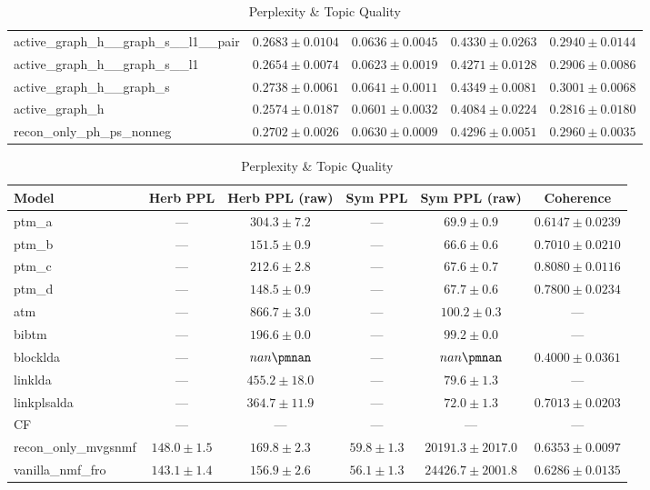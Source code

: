 \begin{table}[htbp]
\begin{subtable}{\textwidth}
\begin{tabular}{lcccc}
active\_graph\_h\_\_graph\_s\_\_l1\_\_pair & $0.2683\pm0.0104$ & $0.0636\pm0.0045$ & $0.4330\pm0.0263$ & $0.2940\pm0.0144$ \\
active\_graph\_h\_\_graph\_s\_\_l1 & $0.2654\pm0.0074$ & $0.0623\pm0.0019$ & $0.4271\pm0.0128$ & $0.2906\pm0.0086$ \\
active\_graph\_h\_\_graph\_s & $0.2738\pm0.0061$ & $0.0641\pm0.0011$ & $0.4349\pm0.0081$ & $0.3001\pm0.0068$ \\
active\_graph\_h & $0.2574\pm0.0187$ & $0.0601\pm0.0032$ & $0.4084\pm0.0224$ & $0.2816\pm0.0180$ \\
recon\_only\_ph\_ps\_nonneg & $0.2702\pm0.0026$ & $0.0630\pm0.0009$ & $0.4296\pm0.0051$ & $0.2960\pm0.0035$ \\
\bottomrule
\end{tabular}
\end{subtable}
\vspace{0.3cm}
\begin{subtable}{\textwidth}
\centering
\caption{Perplexity \& Topic Quality}
\begin{tabular}{lccccc}
\toprule
Model & Herb PPL & Herb PPL (raw) & Sym PPL & Sym PPL (raw) & Coherence \\
\midrule
ptm\_a & --- & $304.3\pm7.2$ & --- & $69.9\pm0.9$ & $0.6147\pm0.0239$ \\
ptm\_b & --- & $151.5\pm0.9$ & --- & $66.6\pm0.6$ & $0.7010\pm0.0210$ \\
ptm\_c & --- & $212.6\pm2.8$ & --- & $67.6\pm0.7$ & $0.8080\pm0.0116$ \\
ptm\_d & --- & $148.5\pm0.9$ & --- & $67.7\pm0.6$ & $0.7800\pm0.0234$ \\
atm & --- & $866.7\pm3.0$ & --- & $100.2\pm0.3$ & --- \\
bibtm & --- & $196.6\pm0.0$ & --- & $99.2\pm0.0$ & --- \\
blocklda & --- & $nan\pmnan$ & --- & $nan\pmnan$ & $0.4000\pm0.0361$ \\
linklda & --- & $455.2\pm18.0$ & --- & $79.6\pm1.3$ & --- \\
linkplsalda & --- & $364.7\pm11.9$ & --- & $72.0\pm1.3$ & $0.7013\pm0.0203$ \\
CF & --- & --- & --- & --- & --- \\
recon\_only\_mvgsnmf & $148.0\pm1.5$ & $169.8\pm2.3$ & $59.8\pm1.3$ & $20191.3\pm2017.0$ & $0.6353\pm0.0097$ \\
vanilla\_nmf\_fro & $143.1\pm1.4$ & $156.9\pm2.6$ & $56.1\pm1.3$ & $24426.7\pm2001.8$ & $0.6286\pm0.0135$ \\

\end{tabular}
\end{subtable}
\end{table}
